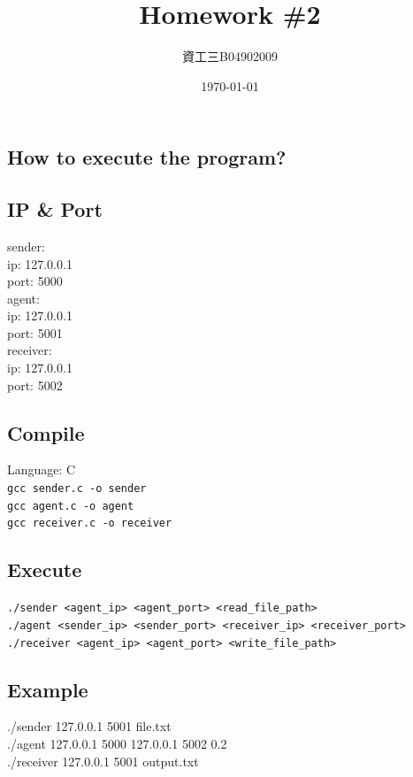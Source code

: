 \documentclass[12t, a4paper]{article}
\title{\vspace{-6ex}\bf{\LARGE{Homework \#2}}}
\author{資工三\space B04902009\space蕭千惠} %
\date{\vspace{-2ex}\today\vspace{-3ex}}
\newcommand\tab[1][1cm]{\hspace*{#1}}
\begin{document}
	\begin{CJK}{UTF8}{bkai}
	\maketitle\thispagestyle{fancy}
	\fontsize{12pt}{16pt} \selectfont	
	
	\section*{How to execute the program?}
		\subsection*{IP \& Port}
		\noindent sender:\\
		\tab	ip: 127.0.0.1\\
		\tab	port: 5000\\
		agent:\\
		\tab	ip: 127.0.0.1\\
		\tab	port: 5001\\
		receiver:\\
		\tab	ip: 127.0.0.1\\
		\tab	port: 5002\\

		\subsection*{Compile}
		\noindent Language: C\\
		\texttt{gcc sender.c -o sender}\\
		\texttt{gcc agent.c -o agent}\\
		\texttt{gcc receiver.c -o receiver}

		\subsection*{Execute}
		\noindent \texttt{./sender <agent\_ip> <agent\_port> <read\_file\_path>}\\
		\texttt{./agent <sender\_ip> <sender\_port> <receiver\_ip> <receiver\_port>}\\
		\texttt{./receiver <agent\_ip> <agent\_port> <write\_file\_path>}\\

		\subsection*{Example}
		\noindent ./sender 127.0.0.1 5001 file.txt\\
		./agent 127.0.0.1 5000 127.0.0.1 5002 0.2\\
		./receiver 127.0.0.1 5001 output.txt\\


\end{CJK}
\end{document}
